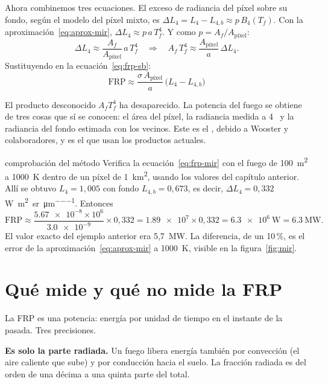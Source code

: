 Ahora combinemos tres ecuaciones. El exceso de radiancia del píxel sobre su fondo, según el
modelo del píxel mixto, es $\Delta L_4 = L_4 - L_{4,b} \approx p\,B_4(T_f)$. Con la
aproximación~\eqref{eq:aprox-mir}, $\Delta L_4 \approx p\,a\,T_f^4$. Y como $p =
A_f/A_{\text{píxel}}$:
\[
  \Delta L_4 \approx \frac{A_f}{A_{\text{píxel}}}\,a\,T_f^4
  \quad\Longrightarrow\quad
  A_f\,T_f^4 \approx \frac{A_{\text{píxel}}}{a}\,\Delta L_4 .
\]
Sustituyendo en la ecuación~\eqref{eq:frp-sb}:
\begin{equation}\label{eq:frp-mir}
  \boxed{\;\mathrm{FRP} \approx \frac{\sigma\,A_{\text{píxel}}}{a}\,\bigl(L_4 - L_{4,b}\bigr)\;}
\end{equation}

El producto desconocido $A_f T_f^4$ ha desaparecido. La potencia del fuego se obtiene de tres
cosas que sí se conocen: el área del píxel, la radiancia medida a 4~\um{} y la radiancia del
fondo estimada con los vecinos. Este es el , debido a Wooster y colaboradores, y es el que usan los productos actuales.

\begin{ejemplo}{comprobación del método}
Verifica la ecuación~\eqref{eq:frp-mir} con el fuego de \SI{100}{\metre\squared} a 1000~K
dentro de un píxel de \SI{1}{\kilo\metre\squared}, usando los valores del capítulo anterior.
\solucion Allí se obtuvo $L_4 = 1{,}005$ con fondo $L_{4,b} = 0{,}673$, es decir, $\Delta L_4 =
0{,}332$ \si{\watt\per\square\metre\per\steradian\per\micro\metre}. Entonces
\[
 \mathrm{FRP} \approx \frac{\num{5.67e-8}\times 10^6}{\num{3.0e-9}}\times 0{,}332
 = \num{1.89e7}\times 0{,}332 = \SI{6.3e6}{\watt} = \SI{6.3}{\mega\watt}.
\]
El valor exacto del ejemplo anterior era 5,7~MW. La diferencia, de un 10\,{}\%, es el error de la
aproximación~\eqref{eq:aprox-mir} a 1000~K, visible en la figura~\ref{fig:mir}.
\end{ejemplo}

\section{Qué mide y qué no mide la FRP}

La FRP es una potencia: energía por unidad de tiempo en el instante de la pasada. Tres
precisiones.

\textbf{Es solo la parte radiada.} Un fuego libera energía también por convección (el aire
caliente que sube) y por conducción hacia el suelo. La fracción radiada es del orden de una
décima a una quinta parte del total.


